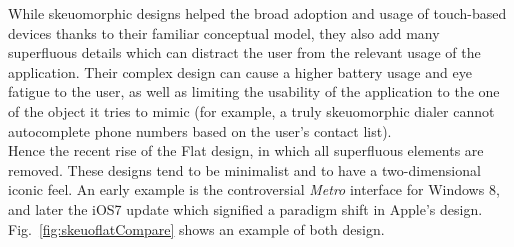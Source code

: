 \documentclass[a4paper,11pt] {article}
\theoremstyle{definition}
\begin{document}
        While skeuomorphic designs helped the broad adoption and usage of touch-based devices thanks to their familiar conceptual model, they also add many superfluous details which can distract the user from the relevant usage of the application. Their complex design can cause a higher battery usage and eye fatigue to the user, as well as limiting the usability of the application to the one of the object it tries to mimic (for example, a truly skeuomorphic dialer cannot autocomplete phone numbers based on the user's contact list).\\

        Hence the recent rise of the Flat design, in which all superfluous elements are removed. These designs tend to be minimalist and to have a two-dimensional iconic feel. An early example is the controversial \textit{Metro} interface for Windows 8, and later the iOS7 update which signified a paradigm shift in Apple's design. Fig.~\ref{fig:skeuoflatCompare} shows an example of both design.
\end{document}
